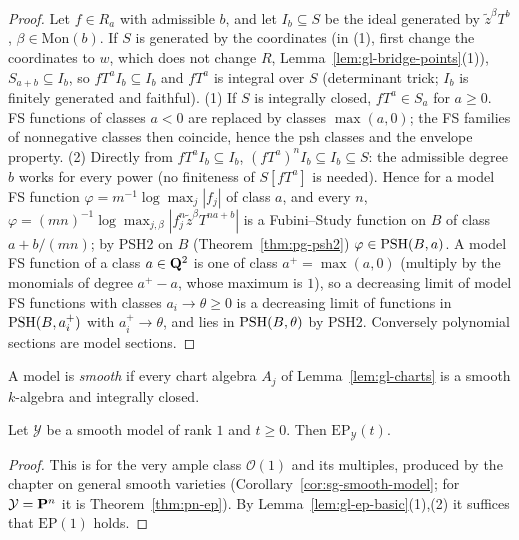 \begin{proof}
Let $f\in R_a$ with admissible $b$, and let $I_b\subseteq S$ be the ideal generated by $\tilde z^\beta T^b$, $\beta\in\mathrm{Mon}(b)$. If $S$ is
generated by the coordinates (in (1), first change the coordinates to $w$, which does not change $R$, Lemma~\ref{lem:gl-bridge-points}(1)), $S_{a+b}\subseteq I_b$, so $fT^aI_b\subseteq I_b$ and $fT^a$ is integral over $S$ (determinant trick; $I_b$ is finitely
generated and faithful). (1) If $S$ is integrally closed, $fT^a\in S_a$ for $a\ge0$. FS functions of classes $a<0$ are replaced by classes $\max(a,0)$; the FS families of nonnegative classes then coincide,
hence the psh classes and the envelope property. (2) Directly from $fT^aI_b\subseteq I_b$, $(fT^a)^nI_b\subseteq I_b\subseteq S$: the admissible degree $b$ works for every power (no
finiteness of $S[fT^a]$ is needed). Hence for a model FS function $\varphi=m^{-1}\log\max_j|f_j|$ of class $a$, and every
$n$, $\varphi=(mn)^{-1}\log\max_{j,\beta}|f_j^n\tilde z^\beta T^{na+b}|$ is a Fubini--Study function on $B$ of class $a+b/(mn)$; by PSH2 on
$B$ (Theorem~\ref{thm:pg-psh2}) $\varphi\in\operatorname{PSH}(B,a)$. A model FS function of a class $a\in\mathbf{Q}^2$ is one of class $a^+=\max(a,0)$ (multiply by the
monomials of degree $a^+-a$, whose maximum is $1$), so a decreasing limit of model FS functions with classes $a_i\to\theta\ge0$ is a decreasing limit of
functions in $\operatorname{PSH}(B,a_i^+)$ with $a_i^+\to\theta$, and lies in $\operatorname{PSH}(B,\theta)$ by PSH2. Conversely polynomial sections are model sections.
\end{proof}

\begin{definition}\label{def:gl-smooth}
\leanok
{}
A model is \emph{smooth} if every chart algebra $A_j$ of Lemma~\ref{lem:gl-charts} is a smooth $k$-algebra and integrally closed.
\end{definition}

\begin{theorem}\label{thm:gl-smooth-ep}
\leanok
{}
Let $\mathcal Y$ be a smooth model of rank $1$ and $t\ge0$. Then $\mathrm{EP}_{\mathcal Y}(t)$.
\end{theorem}

\begin{proof}
This is \cite[Theorem~3.1]{FHX} for the very ample class $\mathcal O(1)$ and its multiples, produced by the chapter on general smooth varieties
(Corollary~\ref{cor:sg-smooth-model}; for $\mathcal Y=\mathbf{P}^n$ it is Theorem~\ref{thm:pn-ep}). By Lemma~\ref{lem:gl-ep-basic}(1),(2) it suffices that $\mathrm{EP}(1)$ holds.
\end{proof}

